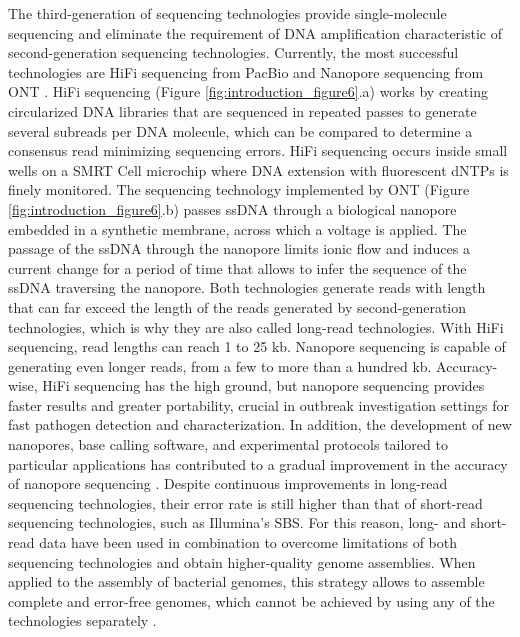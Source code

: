 The third-generation of sequencing technologies provide single-molecule sequencing and eliminate the requirement of \ac{DNA} amplification characteristic of second-generation sequencing technologies. Currently, the most successful technologies are HiFi sequencing from \ac{PacBio} \cite{wenger_accurate_2019, eid_real-time_2009} and Nanopore sequencing from \ac{ONT} \cite{mikheyev_first_2014, stoddart_single-nucleotide_2009}. HiFi sequencing (Figure \ref{fig:introduction_figure6}.a) works by creating circularized \ac{DNA} libraries that are sequenced in repeated passes to generate several subreads per \ac{DNA} molecule, which can be compared to determine a consensus read minimizing sequencing errors. HiFi sequencing occurs inside small wells on a \ac{SMRT} Cell microchip where \ac{DNA} extension with fluorescent \ac{dNTPs} is finely monitored. The sequencing technology implemented by \ac{ONT} (Figure \ref{fig:introduction_figure6}.b) passes \ac{ssDNA} through a biological nanopore embedded in a synthetic membrane, across which a voltage is applied. The passage of the \ac{ssDNA} through the nanopore limits ionic flow and induces a current change for a period of time that allows to infer the sequence of the \ac{ssDNA} traversing the nanopore. Both technologies generate reads with length that can far exceed the length of the reads generated by second-generation technologies, which is why they are also called long-read technologies. With HiFi sequencing, read lengths can reach 1 to 25 \ac{kb}. Nanopore sequencing is capable of generating even longer reads, from a few to more than a hundred \ac{kb}. Accuracy-wise, HiFi sequencing has the high ground, but nanopore sequencing provides faster results and greater portability, crucial in outbreak investigation settings for fast pathogen detection and characterization. In addition, the development of new nanopores, base calling software, and experimental protocols tailored to particular applications has contributed to a gradual improvement in the accuracy of nanopore sequencing \cite{wang_nanopore_2021, wick_autocycler_2025, foster-nyarko_nanopore-only_2023, wick_trycycler_2021}. Despite continuous improvements in long-read sequencing technologies, their error rate is still higher than that of short-read sequencing technologies, such as Illumina's \ac{SBS}. For this reason, long- and short-read data have been used in combination to overcome limitations of both sequencing technologies and obtain higher-quality genome assemblies. When applied to the assembly of bacterial genomes, this strategy allows to assemble complete and error-free genomes, which cannot be achieved by using any of the technologies separately \cite{wick_assembling_2023, bouras_hybracter_2024, stevens_comparison_2023, wick_assembling_2023, bouras_hybracter_2024}.


